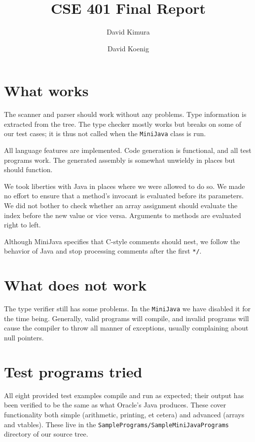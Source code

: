 \documentclass[letterpaper]{article}
\title{CSE 401 Final Report}
\author{David Kimura \and David Koenig}
\begin{document}
\maketitle

\section{What works}

The scanner and parser should work without any problems. Type information
is extracted from the tree. The type checker mostly works but breaks on some
of our test cases; it is thus not called when the \texttt{MiniJava} class is
run.

All language features are implemented. Code generation is functional, and
all test programs work. The generated assembly is somewhat unwieldy in
places but should function.

We took liberties with Java in places where we were allowed to do so. We
made no effort to ensure that a method's invocant is evaluated before its
parameters. We did not bother to check whether an array assignment should
evaluate the index before the new value or vice versa. Arguments to methods
are evaluated right to left.

Although MiniJava specifies that C-style comments should nest, we follow the
behavior of Java and stop processing comments after the first \texttt{*/}.

\section{What does not work}

The type verifier still has some problems. In the \texttt{MiniJava} we have
disabled it for the time being. Generally, valid programs will compile, and
invalid programs will cause the compiler to throw all manner of exceptions,
usually complaining about null pointers.

\section{Test programs tried}

All eight provided test examples compile and run as expected; their output
has been verified to be the same as what Oracle's Java produces. These cover
functionality both simple (arithmetic, printing, et cetera) and advanced
(arrays and vtables). These live in the
\texttt{SamplePrograms/SampleMiniJavaPrograms} directory of our source tree.
\end{document}
